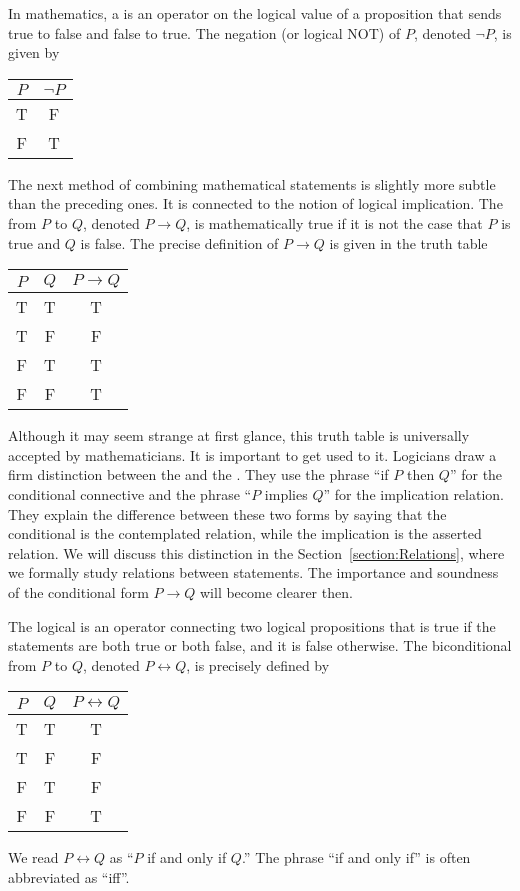 In mathematics, a  is an operator on the logical value of a proposition that sends true to false and false to true.
The negation (or logical NOT) of $P$, denoted $\neg P$, is given by
\begin{center}
\begin{tabular}{|c|c|}
\hline
$P$ & $\neg P$ \\
\hline
T & F \\
F & T \\
\hline
\end{tabular}
\end{center}

The next method of combining mathematical statements is slightly more subtle than the preceding ones.
It is connected to the notion of logical implication.
The  from $P$ to $Q$, denoted $P \rightarrow Q$, is mathematically true if it is not the case that $P$ is true and $Q$ is false.
The precise definition of $P \rightarrow Q$ is given in the truth table
\begin{center}
\begin{tabular}{|c|c|c|}
\hline
$P$ & $Q$ & $P \rightarrow Q$ \\
\hline
T & T & T \\
T & F & F \\
F & T & T \\
F & F & T \\
\hline
\end{tabular}
\end{center}
Although it may seem strange at first glance, this truth table is universally accepted by mathematicians.
It is important to get used to it.
Logicians draw a firm distinction between the  and the .
They use the phrase ``if $P$ then $Q$'' for the conditional connective and the phrase ``$P$ implies $Q$'' for the implication relation.
They explain the difference between these two forms by saying that the conditional is the contemplated relation, while the implication is the asserted relation.
We will discuss this distinction in the Section~\ref{section:Relations}, where we formally study relations between statements.
The importance and soundness of the conditional form $P \rightarrow Q$ will become clearer then.

The logical  is an operator connecting two logical propositions that is true if the statements are both true or both false, and it is false otherwise.
The biconditional from $P$ to $Q$, denoted $P \leftrightarrow Q$, is precisely defined by
\begin{center}
\begin{tabular}{|c|c|c|}
\hline
$P$ & $Q$ & $P \leftrightarrow Q$ \\
\hline
T & T & T \\
T & F & F \\
F & T & F \\
F & F & T \\
\hline
\end{tabular}
\end{center}
We read $P \leftrightarrow Q$ as ``$P$ if and only if $Q$.''
The phrase ``if and only if'' is often abbreviated as ``iff''.

